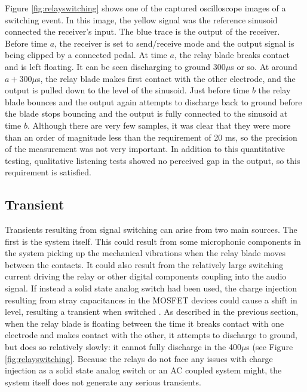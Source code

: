 \documentclass{article}
\begin{document}
	Figure \ref{fig:relayswitching} shows one of the captured oscilloscope images of a switching event.  In this image, the yellow signal was the reference sinusoid connected the receiver's input.  The blue trace is the output of the receiver.  Before time $a$, the receiver is set to send/receive mode and the output signal is being clipped by a connected pedal. At time $a$, the relay blade breaks contact and is left floating.  It can be seen discharging to ground 300$\mu$s or so.  At around $a + 300\mu$s, the relay blade makes first contact with the other electrode, and the output is pulled down to the level of the sinusoid.  Just before time $b$ the relay blade bounces and the output again attempts to discharge back to ground before the blade stops bouncing and the output is fully connected to the sinusoid at time $b$.  Although there are very few samples, it was clear that they were more than an order of magnitude less than the requirement of 20 ms, so the precision of the measurement was not very important.  In addition to this quantitative testing, qualitative listening tests showed no perceived gap in the output, so this requirement is satisfied.

	\subsection{Transient}
	Transients resulting from signal switching can arise from two main sources.  The first is the system itself.  This could result from some microphonic components in the system picking up the mechanical vibrations when the relay blade moves between the contacts.  It could also result from the relatively large switching current driving the relay or other digital components coupling into the audio signal.  If instead a solid state analog switch had been used, the charge injection resulting from stray capacitances in the MOSFET devices could cause a shift in level, resulting a transient when switched \cite{ADI_switches_notes}.  As described in the previous section, when the relay blade is floating between the time it breaks contact with one electrode and makes contact with the other, it attempts to discharge to ground, but does so relatively slowly: it cannot fully discharge in the 400$\mu$s (see Figure \ref{fig:relayswitching}.  Because the relays do not face any issues with charge injection as a solid state analog switch or an AC coupled system might, the system itself does not generate any serious transients.
\end{document}
